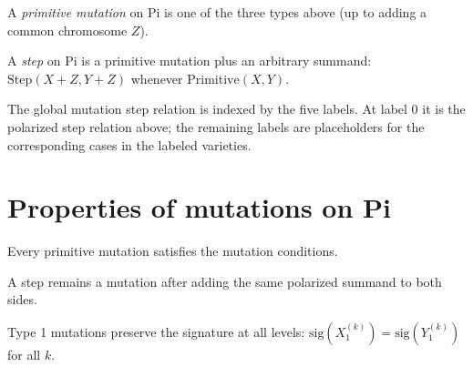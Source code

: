 \begin{definition}
  \label{def:Pi.Primitive}
  \leanok
  A \emph{primitive mutation} on $\mathrm{Pi}$ is one of the three types above (up to adding a common chromosome $Z$).
\end{definition}

\begin{definition}
  \label{def:Pi.Step}
  \leanok
  A \emph{step} on $\mathrm{Pi}$ is a primitive mutation plus an arbitrary summand:
  $\mathrm{Step}(X+Z, Y+Z)$ whenever $\mathrm{Primitive}(X, Y)$.
\end{definition}

\begin{definition}
  \label{def:Mutation.Step}
  \leanok
  The global mutation step relation is indexed by the five labels.  At label
  $0$ it is the polarized step relation above; the remaining labels are
  placeholders for the corresponding cases in the labeled varieties.
\end{definition}

\section{Properties of mutations on Pi}

\begin{lemma}
  \label{lem:Pi.Primitive.isMutation}
  \leanok
  Every primitive mutation satisfies the mutation conditions.
\end{lemma}

\begin{lemma}
  \label{lem:Pi.Step.isMutation}
  \leanok
  A step remains a mutation after adding the same polarized summand to both
  sides.
\end{lemma}

\begin{lemma}
  \label{lem:mutation_type1_signature_eq}
  \leanok
  Type 1 mutations preserve the signature at all levels:
  $\mathrm{sig}(X_1^{(k)}) = \mathrm{sig}(Y_1^{(k)})$ for all $k$.
\end{lemma}

